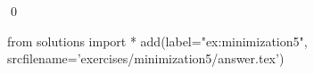 
\begin{ex} 
  \label{ex:minimization5}
  
  \qed
\end{ex} 
\begin{python0}
from solutions import *
add(label="ex:minimization5",
    srcfilename='exercises/minimization5/answer.tex') 
\end{python0}

